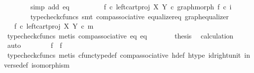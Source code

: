 \begin{isabellebody}
\ \ \ \ \ \ \isamarkupfalse%
\ {\isacharparenleft}{\kern0pt}simp\ add{\isacharcolon}{\kern0pt}\ eq{}{\isacharparenright}{\kern0pt}\isanewline
\ \ \ \ \isamarkupfalse%
\ \isamarkupfalse%
\ {\isachardoublequoteopen}{\isachardot}{\kern0pt}{\isachardot}{\kern0pt}{\isachardot}{\kern0pt}\ {\isacharequal}{\kern0pt}\ {\isacharparenleft}{\kern0pt}f{}\ {\isasymcirc}\isactrlsub c\ left{\isacharunderscore}{\kern0pt}cart{\isacharunderscore}{\kern0pt}proj\ X\ Y{\isacharparenright}{\kern0pt}\ {\isasymcirc}\isactrlsub c\ graph{\isacharunderscore}{\kern0pt}morph\ f{}\ {\isasymcirc}\isactrlsub c\ i{}{\isachardoublequoteclose}\isanewline
\ \ \ \ \ \ \isamarkupfalse%
\ {\isacharparenleft}{\kern0pt}typecheck{\isacharunderscore}{\kern0pt}cfuncs{\isacharcomma}{\kern0pt}\ smt\ comp{\isacharunderscore}{\kern0pt}associative{}\ equalizer{\isacharunderscore}{\kern0pt}eq\ graph{\isacharunderscore}{\kern0pt}equalizer{}{\isacharparenright}{\kern0pt}\isanewline
\ \ \ \ \isamarkupfalse%
\ \isamarkupfalse%
\ {\isachardoublequoteopen}{\isachardot}{\kern0pt}{\isachardot}{\kern0pt}{\isachardot}{\kern0pt}\ {\isacharequal}{\kern0pt}\ f{}\ {\isasymcirc}\isactrlsub c\ left{\isacharunderscore}{\kern0pt}cart{\isacharunderscore}{\kern0pt}proj\ X\ Y\ {\isasymcirc}\isactrlsub c\ m{\isachardoublequoteclose}\isanewline
\ \ \ \ \ \ \isamarkupfalse%
\ {\isacharparenleft}{\kern0pt}typecheck{\isacharunderscore}{\kern0pt}cfuncs{\isacharcomma}{\kern0pt}\ metis\ comp{\isacharunderscore}{\kern0pt}associative{}\ eq{}\ eq{}{\isacharparenright}{\kern0pt}\isanewline
\ \ \ \ \isamarkupfalse%
\ \isamarkupfalse%
\ {\isacharquery}{\kern0pt}thesis\ \isamarkupfalse%
\ calculation\ \isamarkupfalse%
\ auto\isanewline
\ \ \isamarkupfalse%
\isanewline
\ \ \isamarkupfalse%
\ \isamarkupfalse%
\ {\isachardoublequoteopen}f{}\ {\isacharequal}{\kern0pt}\ f{}{\isachardoublequoteclose}\isanewline
\ \ \ \ \isamarkupfalse%
\ {\isacharparenleft}{\kern0pt}typecheck{\isacharunderscore}{\kern0pt}cfuncs{\isacharcomma}{\kern0pt}\ metis\ cfunc{\isacharunderscore}{\kern0pt}type{\isacharunderscore}{\kern0pt}def\ comp{\isacharunderscore}{\kern0pt}associative\ h{\isacharunderscore}{\kern0pt}def\ h{\isacharunderscore}{\kern0pt}type\ id{\isacharunderscore}{\kern0pt}right{\isacharunderscore}{\kern0pt}unit{}\ inverse{\isacharunderscore}{\kern0pt}def{}\ isomorphism{\isacharparenright}{\kern0pt}\isanewline
{}\isamarkupfalse%
%
\endisatagproof
{\isafoldproof}%
%
\isadelimproof
\isanewline
%
\endisadelimproof
%
\isadelimtheory
\isanewline
%
\endisadelimtheory
%
\isatagtheory
{}\isamarkupfalse%
%
\endisatagtheory
{\isafoldtheory}%
%
\isadelimtheory
%
\endisadelimtheory
%
\end{isabellebody}%
